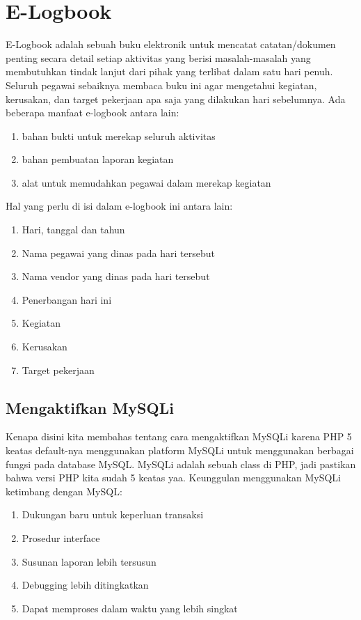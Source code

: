 \section{E-Logbook}
E-Logbook adalah sebuah buku elektronik untuk mencatat catatan/dokumen penting secara detail setiap aktivitas yang berisi masalah-masalah yang membutuhkan tindak lanjut dari pihak yang terlibat dalam satu hari penuh. Seluruh pegawai sebaiknya membaca buku ini agar mengetahui kegiatan, kerusakan, dan target pekerjaan apa saja yang dilakukan hari sebelumnya. Ada beberapa manfaat e-logbook antara lain:
\begin{enumerate}
\item bahan bukti untuk merekap seluruh aktivitas
\item bahan pembuatan laporan kegiatan
\item alat untuk memudahkan pegawai dalam merekap kegiatan
 \end{enumerate}

Hal yang perlu di isi dalam e-logbook ini antara lain:
\begin{enumerate}
\item Hari, tanggal dan tahun
\item Nama pegawai yang dinas pada hari tersebut
\item Nama vendor yang dinas pada hari tersebut
\item Penerbangan hari ini
\item Kegiatan
\item Kerusakan
\item Target pekerjaan
\end{enumerate}


\subsection{Mengaktifkan MySQLi}
Kenapa disini kita membahas tentang cara mengaktifkan MySQLi karena PHP 5 keatas default-nya menggunakan platform MySQLi untuk menggunakan berbagai fungsi pada database MySQL. MySQLi adalah sebuah class di PHP, jadi pastikan bahwa versi PHP kita sudah 5 keatas yaa.
Keunggulan menggunakan MySQLi ketimbang dengan MySQL:
\begin{enumerate}
\item Dukungan baru untuk keperluan transaksi
\item Prosedur interface
\item Susunan laporan lebih tersusun
\item Debugging lebih ditingkatkan
\item Dapat memproses dalam waktu yang lebih singkat
\end{enumerate}

